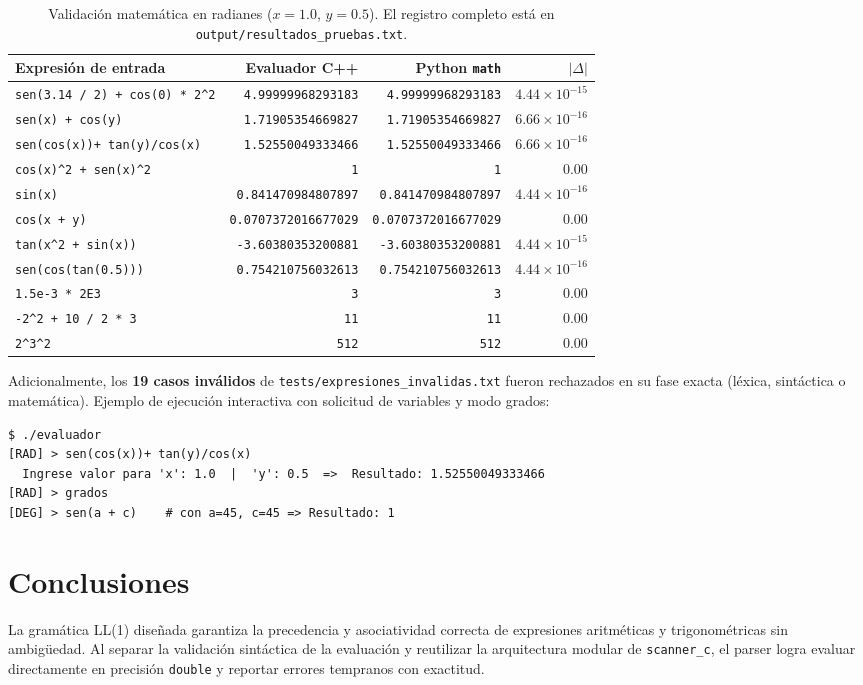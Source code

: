 \documentclass[10pt,a4paper]{article}
\begin{document}
\begin{table}[H]
\centering
\scriptsize
\begin{tabular}{p{6.0cm}rrr}
\toprule
\textbf{Expresión de entrada} & \textbf{Evaluador C++} & \textbf{Python \texttt{math}} & \textbf{$|\Delta|$} \\
\midrule
\texttt{sen(3.14 / 2) + cos(0) * 2\^{}2} & \texttt{4.99999968293183} & \texttt{4.99999968293183} & $4.44\times 10^{-15}$ \\
\texttt{sen(x) + cos(y)} & \texttt{1.71905354669827} & \texttt{1.71905354669827} & $6.66\times 10^{-16}$ \\
\texttt{sen(cos(x))+ tan(y)/cos(x)} & \texttt{1.52550049333466} & \texttt{1.52550049333466} & $6.66\times 10^{-16}$ \\
\texttt{cos(x)\^{}2 + sen(x)\^{}2} & \texttt{1} & \texttt{1} & $0.00$ \\
\texttt{sin(x)} & \texttt{0.841470984807897} & \texttt{0.841470984807897} & $4.44\times 10^{-16}$ \\
\texttt{cos(x + y)} & \texttt{0.0707372016677029} & \texttt{0.0707372016677029} & $0.00$ \\
\texttt{tan(x\^{}2 + sin(x))} & \texttt{-3.60380353200881} & \texttt{-3.60380353200881} & $4.44\times 10^{-15}$ \\
\texttt{sen(cos(tan(0.5)))} & \texttt{0.754210756032613} & \texttt{0.754210756032613} & $4.44\times 10^{-16}$ \\
\texttt{1.5e-3 * 2E3} & \texttt{3} & \texttt{3} & $0.00$ \\
\texttt{-2\^{}2 + 10 / 2 * 3} & \texttt{11} & \texttt{11} & $0.00$ \\
\texttt{2\^{}3\^{}2} & \texttt{512} & \texttt{512} & $0.00$ \\
\bottomrule
\end{tabular}
\caption{Validación matemática en radianes ($x=1.0$, $y=0.5$). El registro completo está en \texttt{output/resultados\_pruebas.txt}.}
\end{table}

\noindent Adicionalmente, los \textbf{19 casos inválidos} de \texttt{tests/expresiones\_invalidas.txt} fueron rechazados en su fase exacta (léxica, sintáctica o matemática). Ejemplo de ejecución interactiva con solicitud de variables y modo grados:

\begin{lstlisting}
$ ./evaluador
[RAD] > sen(cos(x))+ tan(y)/cos(x)
  Ingrese valor para 'x': 1.0  |  'y': 0.5  =>  Resultado: 1.52550049333466
[RAD] > grados
[DEG] > sen(a + c)    # con a=45, c=45 => Resultado: 1
\end{lstlisting}

\section{Conclusiones}
La gramática LL(1) diseñada garantiza la precedencia y asociatividad correcta de expresiones aritméticas y trigonométricas sin ambigüedad. Al separar la validación sintáctica de la evaluación y reutilizar la arquitectura modular de \texttt{scanner\_c}, el parser logra evaluar directamente en precisión \texttt{double} y reportar errores tempranos con exactitud.
\end{document}
